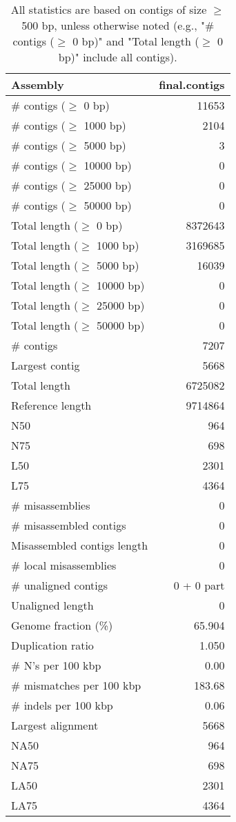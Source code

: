 \documentclass[12pt,a4paper]{article}
\begin{document}
\begin{table}[ht]
\begin{center}
\caption{All statistics are based on contigs of size $\geq$ 500 bp, unless otherwise noted (e.g., "\# contigs ($\geq$ 0 bp)" and "Total length ($\geq$ 0 bp)" include all contigs).}
\begin{tabular}{|l*{1}{|r}|}
\hline
Assembly & final.contigs \\ \hline
\# contigs ($\geq$ 0 bp) & 11653 \\ \hline
\# contigs ($\geq$ 1000 bp) & 2104 \\ \hline
\# contigs ($\geq$ 5000 bp) & 3 \\ \hline
\# contigs ($\geq$ 10000 bp) & 0 \\ \hline
\# contigs ($\geq$ 25000 bp) & 0 \\ \hline
\# contigs ($\geq$ 50000 bp) & 0 \\ \hline
Total length ($\geq$ 0 bp) & 8372643 \\ \hline
Total length ($\geq$ 1000 bp) & 3169685 \\ \hline
Total length ($\geq$ 5000 bp) & 16039 \\ \hline
Total length ($\geq$ 10000 bp) & 0 \\ \hline
Total length ($\geq$ 25000 bp) & 0 \\ \hline
Total length ($\geq$ 50000 bp) & 0 \\ \hline
\# contigs & 7207 \\ \hline
Largest contig & 5668 \\ \hline
Total length & 6725082 \\ \hline
Reference length & 9714864 \\ \hline
N50 & 964 \\ \hline
N75 & 698 \\ \hline
L50 & 2301 \\ \hline
L75 & 4364 \\ \hline
\# misassemblies & 0 \\ \hline
\# misassembled contigs & 0 \\ \hline
Misassembled contigs length & 0 \\ \hline
\# local misassemblies & 0 \\ \hline
\# unaligned contigs & 0 + 0 part \\ \hline
Unaligned length & 0 \\ \hline
Genome fraction (\%) & 65.904 \\ \hline
Duplication ratio & 1.050 \\ \hline
\# N's per 100 kbp & 0.00 \\ \hline
\# mismatches per 100 kbp & 183.68 \\ \hline
\# indels per 100 kbp & 0.06 \\ \hline
Largest alignment & 5668 \\ \hline
NA50 & 964 \\ \hline
NA75 & 698 \\ \hline
LA50 & 2301 \\ \hline
LA75 & 4364 \\ \hline
\end{tabular}
\end{center}
\end{table}
\end{document}
